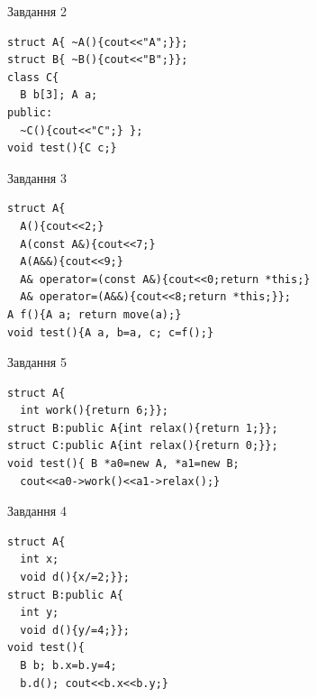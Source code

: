 \documentclass[12pt, ukrainian]{article}
\begin{document}
{{{{{{{{{{{{{{\begin{minipage}[t]{11cm}
               
{\begin{center}Завдання {2}\end{center}}
\vspace{-6mm}

\begin{verbatim}
struct A{ ~A(){cout<<"A";}};
struct B{ ~B(){cout<<"B";}};
class C{
  B b[3]; A a;
public:
  ~C(){cout<<"C";} };
void test(){C c;}
\end{verbatim}            


               
{\begin{center}Завдання {3}\end{center}}
\vspace{-6mm}

\begin{verbatim}
struct A{
  A(){cout<<2;}
  A(const A&){cout<<7;}
  A(A&&){cout<<9;}
  A& operator=(const A&){cout<<0;return *this;}
  A& operator=(A&&){cout<<8;return *this;}};
A f(){A a; return move(a);}
void test(){A a, b=a, c; c=f();}
\end{verbatim}            


               
{\begin{center}Завдання {5}\end{center}}
\vspace{-6mm}

\begin{verbatim}
struct A{
  int work(){return 6;}}; 
struct B:public A{int relax(){return 1;}};
struct C:public A{int relax(){return 0;}};
void test(){ B *a0=new A, *a1=new B;
  cout<<a0->work()<<a1->relax();}
\end{verbatim}            


\end{minipage}
\vline \hspace{8mm}
\begin{minipage}[t]{7cm}
               
{\begin{center}Завдання {4}\end{center}}
\vspace{-6mm}

\begin{verbatim}
struct A{
  int x;
  void d(){x/=2;}};
struct B:public A{
  int y;
  void d(){y/=4;}};
void test(){
  B b; b.x=b.y=4;
  b.d(); cout<<b.x<<b.y;}
\end{verbatim}            



\end{minipage}}}}}}}}}}}}}}}
\end{document}
